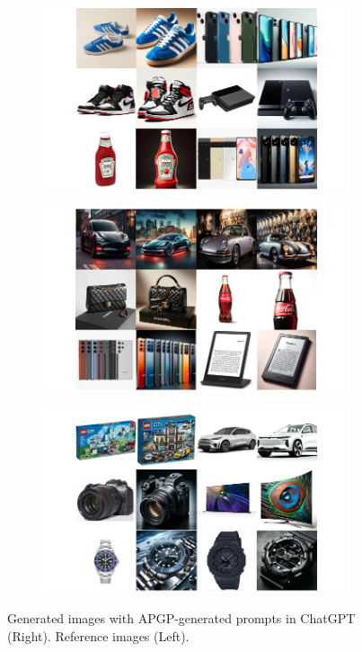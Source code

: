 \begin{figure}[ht]
    \centering
    \begin{subfigure}[t]{0.85\linewidth}
        \includegraphics[width=0.99\textwidth]{figure_folder/3.png}
    \end{subfigure}
    \hfill
    \begin{subfigure}[t]{0.85\linewidth}
        \includegraphics[width=0.99\textwidth]{figure_folder/4.png}
    \end{subfigure}
    \begin{subfigure}[t]{0.85\linewidth}
        \includegraphics[width=0.99\textwidth]{figure_folder/5.png}
  
    \end{subfigure}
    \caption{Generated images with APGP-generated prompts in ChatGPT (Right). Reference images (Left).}
    \label{app:final_output2}
\end{figure}
